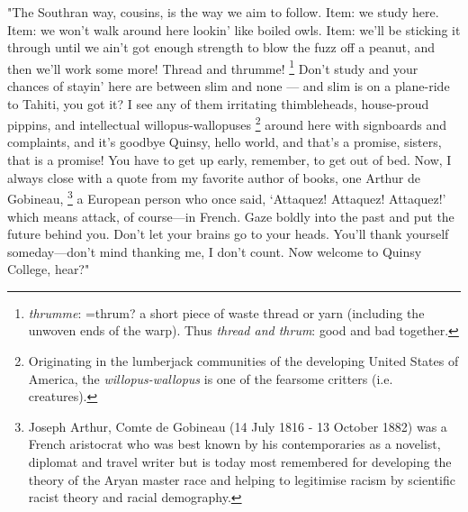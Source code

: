   "The Southran way, cousins, is the way we aim to follow. Item: we study here.
Item: we won't walk around here lookin' like boiled owls. Item: we'll be
sticking it through until we ain't got enough strength to blow the fuzz off a
peanut, and then we'll work some more! Thread and thrumme! 
\footnote{ \textit{thrumme}: =thrum? a short piece of waste thread or yarn 
  (including the unwoven ends of the warp). Thus \textit{thread and thrum}: good
  and bad together. }
Don't study and your chances of stayin' here are between slim and none
--- and slim is on a plane-ride to
Tahiti, you got it? I see any of them irritating thimbleheads, 
house-proud pippins, 
and intellectual willopus-wallopuses 
\footnote{ Originating in the lumberjack communities of the developing United
States of America, the \textit{willopus-wallopus} is one of the fearsome
critters (i.e. creatures).
}
around here with signboards and
complaints, and it's goodbye Quinsy, hello world, and that's a promise, sisters,
that is a promise! You have to get up early, remember, to get out of bed. Now, I
always close with a quote from my favorite author of books, one Arthur de
Gobineau, 
\footnote{ Joseph Arthur, Comte de Gobineau (14 July 1816 - 13 October 1882) was
a French aristocrat who was best known by his contemporaries as a novelist,
diplomat and travel writer but is today most remembered for developing the
theory of the Aryan master race and helping to legitimise racism by scientific
racist theory and racial demography. 
}
a European person who once said, `Attaquez! Attaquez! Attaquez!' which
means attack, of course---in French. Gaze boldly into the past and put the future
behind you. Don't let your brains go to your heads. You'll thank yourself
someday---don't mind thanking me, I don't count. Now welcome to Quinsy College,
hear?"
 
